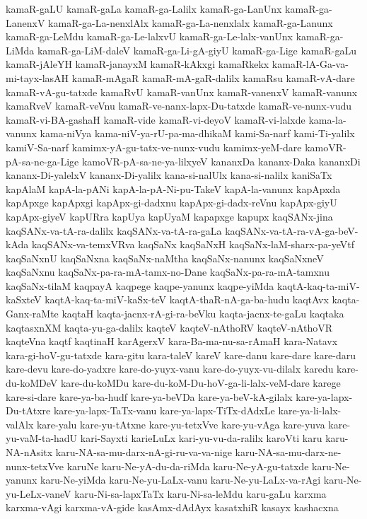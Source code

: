 {kamaR-gaLU
kamaR-gaLa
kamaR-ga-Lalilx
kamaR-ga-LanUnx
kamaR-ga-LanenxV
kamaR-ga-La-nenxlAlx
kamaR-ga-La-nenxlalx
kamaR-ga-Lanunx
kamaR-ga-LeMdu
kamaR-ga-Le-lalxvU
kamaR-ga-Le-lalx-vanUnx
kamaR-ga-LiMda
kamaR-ga-LiM-daleV
kamaR-ga-Li-gA-giyU
kamaR-ga-Lige
kamaR-gaLu
kamaR-jAleYH
kamaR-janayxM
kamaR-kAkxgi
kamaRkekx
kamaR-lA-Ga-va-mi-tayx-lasAH
kamaR-mAgaR
kamaR-mA-gaR-dalilx
kamaRsu
kamaR-vA-dare
kamaR-vA-gu-tatxde
kamaRvU
kamaR-vanUnx
kamaR-vanenxV
kamaR-vanunx
kamaRveV
kamaR-veVnu
kamaR-ve-nanx-lapx-Du-tatxde
kamaR-ve-nunx-vudu
kamaR-vi-BA-gashaH
kamaR-vide
kamaR-vi-deyoV
kamaR-vi-lalxde
kama-la-vanunx
kama-niVya
kama-niV-ya-rU-pa-ma-dhikaM
kami-Sa-narf
kami-Ti-yalilx
kamiV-Sa-narf
kamimx-yA-gu-tatx-ve-nunx-vudu
kamimx-yeM-dare
kamoVR-pA-sa-ne-ga-Lige
kamoVR-pA-sa-ne-ya-lilxyeV
kananxDa
kananx-Daka
kananxDi
kananx-Di-yalelxV
kananx-Di-yalilx
kana-si-nalUlx
kana-si-nalilx
kaniSaTx
kapAlaM
kapA-la-pANi
kapA-la-pA-Ni-pu-TakeV
kapA-la-vanunx
kapApxda
kapApxge
kapApxgi
kapApx-gi-dadxnu
kapApx-gi-dadx-reVnu
kapApx-giyU
kapApx-giyeV
kapURra
kapUya
kapUyaM
kapapxge
kapupx
kaqSANx-jina
kaqSANx-va-tA-ra-dalilx
kaqSANx-va-tA-ra-gaLa
kaqSANx-va-tA-ra-vA-ga-beV-kAda
kaqSANx-va-temxVRva
kaqSaNx
kaqSaNxH
kaqSaNx-laM-sharx-pa-yeVtf
kaqSaNxnU
kaqSaNxna
kaqSaNx-naMtha
kaqSaNx-nanunx
kaqSaNxneV
kaqSaNxnu
kaqSaNx-pa-ra-mA-tamx-no-Dane
kaqSaNx-pa-ra-mA-tamxnu
kaqSaNx-tilaM
kaqpayA
kaqpege
kaqpe-yanunx
kaqpe-yiMda
kaqtA-kaq-ta-miV-kaSxteV
kaqtA-kaq-ta-miV-kaSx-teV‌
kaqtA-thaR-nA-ga-ba-hudu
kaqtAvx
kaqta-Ganx-raMte
kaqtaH
kaqta-jacnx-rA-gi-ra-beVku
kaqta-jacnx-te-gaLu
kaqtaka
kaqtasxnXM
kaqta-yu-ga-dalilx
kaqteV
kaqteV-nAthoRV
kaqteV-nAthoVR
kaqteVna
kaqtf
kaqtinaH
karAgerxV
kara-Ba-ma-nu-sa-rAmaH
kara-Natavx
kara-gi-hoV-gu-tatxde
kara-gitu
kara-taleV
kareV
kare-danu
kare-dare
kare-daru
kare-devu
kare-do-yadxre
kare-do-yuyx-vanu
kare-do-yuyx-vu-dilalx
karedu
kare-du-koMDeV
kare-du-koMDu
kare-du-koM-Du-hoV-ga-li-lalx-veM-dare
karege
kare-si-dare
kare-ya-ba-hudf
kare-ya-beVDa
kare-ya-beV-kA-gilalx
kare-ya-lapx-Du-tAtxre
kare-ya-lapx-TaTx-vanu
kare-ya-lapx-TiTx-dAdxLe
kare-ya-li-lalx-valAlx
kare-yalu
kare-yu-tAtxne
kare-yu-tetxVve
kare-yu-vAga
kare-yuva
kare-yu-vaM-ta-hadU
kari-Sayxti
karieLuLx
kari-yu-vu-da-ralilx
karoVti
karu
karu-NA-nAsitx
karu-NA-sa-mu-darx-nA-gi-ru-va-va-nige
karu-NA-sa-mu-darx-ne-nunx-tetxVve
karuNe
karu-Ne-yA-du-da-riMda
karu-Ne-yA-gu-tatxde
karu-Ne-yanunx
karu-Ne-yiMda
karu-Ne-yu-LaLx-vanu
karu-Ne-yu-LaLx-va-rAgi
karu-Ne-yu-LeLx-vaneV
karu-Ni-sa-lapxTaTx
karu-Ni-sa-leMdu
karu-gaLu
karxma
karxma-vAgi
karxma-vA-gide
kasAmx-dAdAyx
kasatxhiR
kasayx
kashacxna
}
